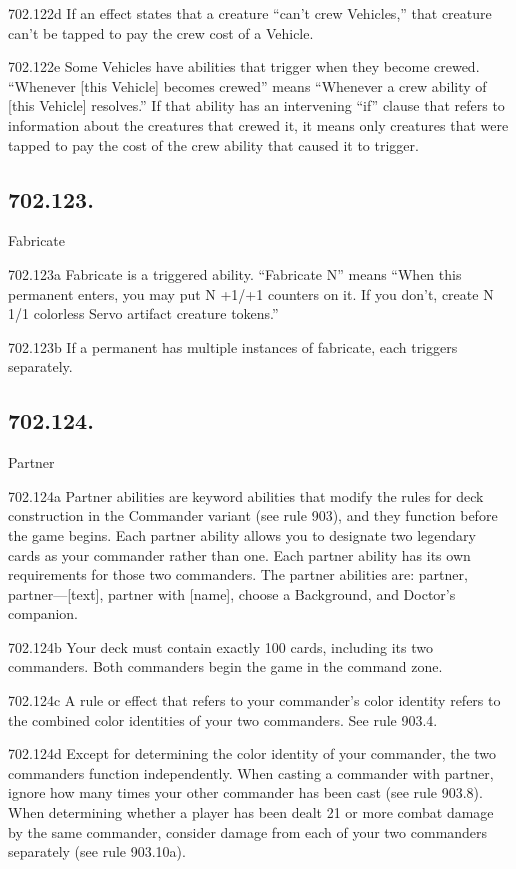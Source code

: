 702.122d If an effect states that a creature “can’t crew Vehicles,” that creature can’t be tapped to pay the crew cost of a Vehicle.

702.122e Some Vehicles have abilities that trigger when they become crewed. “Whenever [this Vehicle] becomes crewed” means “Whenever a crew ability of [this Vehicle] resolves.” If that ability has an intervening “if” clause that refers to information about the creatures that crewed it, it means only creatures that were tapped to pay the cost of the crew ability that caused it to trigger.

\subsection*{702.123.}
Fabricate

702.123a Fabricate is a triggered ability. “Fabricate N” means “When this permanent enters, you may put N +1/+1 counters on it. If you don’t, create N 1/1 colorless Servo artifact creature tokens.”

702.123b If a permanent has multiple instances of fabricate, each triggers separately.

\subsection*{702.124.}
Partner

702.124a Partner abilities are keyword abilities that modify the rules for deck construction in the Commander variant (see rule 903), and they function before the game begins. Each partner ability allows you to designate two legendary cards as your commander rather than one. Each partner ability has its own requirements for those two commanders. The partner abilities are: partner, partner—[text], partner with [name], choose a Background, and Doctor’s companion.

702.124b Your deck must contain exactly 100 cards, including its two commanders. Both commanders begin the game in the command zone.

702.124c A rule or effect that refers to your commander’s color identity refers to the combined color identities of your two commanders. See rule 903.4.

702.124d Except for determining the color identity of your commander, the two commanders function independently. When casting a commander with partner, ignore how many times your other commander has been cast (see rule 903.8). When determining whether a player has been dealt 21 or more combat damage by the same commander, consider damage from each of your two commanders separately (see rule 903.10a).

